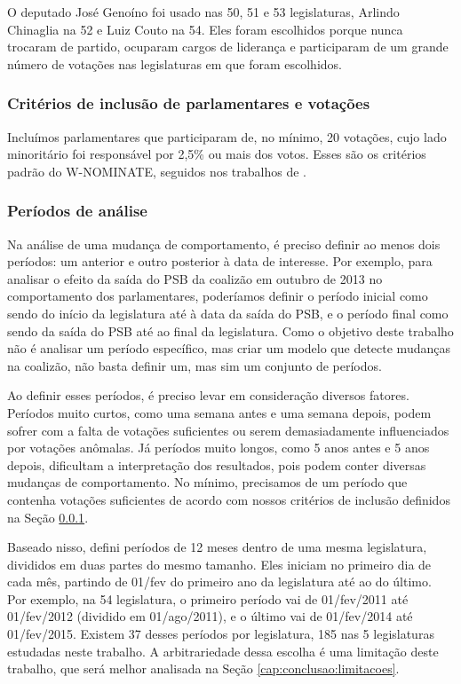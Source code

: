 \documentclass[a4paper,titlepage]{ppgi}\usepackage[]{graphicx}\usepackage[]{color}
\begin{document}
O deputado José Genoíno foi usado nas 50\textordfeminine{},
51\textordfeminine{} e 53\textordfeminine{} legislaturas, Arlindo Chinaglia na
52\textordfeminine{} e Luiz Couto na 54\textordfeminine{}. Eles foram
escolhidos porque nunca trocaram de partido, ocuparam cargos de liderança e
participaram de um grande número de votações nas legislaturas em que foram
escolhidos.

\subsubsection{Critérios de inclusão de parlamentares e votações}
\label{cap:desenvolvimento:criterios-de-inclusao}

Incluímos parlamentares que participaram de, no mínimo, 20 votações, cujo lado
minoritário foi responsável por 2,5\% ou mais dos votos. Esses são os critérios
padrão do W-NOMINATE, seguidos nos trabalhos de
.

\subsubsection{Períodos de análise}
\label{cap:desenvolvimento:periodos-de-analise}

Na análise de uma mudança de comportamento, é preciso definir ao menos dois
períodos: um anterior e outro posterior à data de interesse. Por exemplo, para
analisar o efeito da saída do PSB da coalizão em outubro de 2013 no
comportamento dos parlamentares, poderíamos definir o período inicial como
sendo do início da legislatura até à data da saída do PSB, e o período final
como sendo da saída do PSB até ao final da legislatura. Como o objetivo deste
trabalho não é analisar um período específico, mas criar um modelo que detecte
mudanças na coalizão, não basta definir um, mas sim um conjunto de
períodos.

Ao definir esses períodos, é preciso levar em consideração diversos fatores.
Períodos muito curtos, como uma semana antes e uma semana depois, podem sofrer
com a falta de votações suficientes ou serem demasiadamente influenciados por
votações anômalas. Já períodos muito longos, como 5 anos antes e 5 anos depois,
dificultam a interpretação dos resultados, pois podem conter diversas mudanças
de comportamento. No mínimo, precisamos de um período que contenha votações
suficientes de acordo com nossos critérios de inclusão definidos na Seção
\ref{cap:desenvolvimento:criterios-de-inclusao}.

Baseado nisso, defini períodos de 12 meses dentro de uma mesma legislatura,
divididos em duas partes do mesmo tamanho. Eles iniciam no primeiro dia de cada
mês, partindo de 01/fev do primeiro ano da legislatura até ao do último. Por
exemplo, na 54\textordfeminine{} legislatura, o primeiro período vai de
01/fev/2011 até 01/fev/2012 (dividido em 01/ago/2011), e o último vai de
01/fev/2014 até 01/fev/2015. Existem 37 desses períodos por legislatura, 185
nas 5 legislaturas estudadas neste trabalho. A arbitrariedade dessa escolha é
uma limitação deste trabalho, que será melhor analisada na Seção
\ref{cap:conclusao:limitacoes}.
\end{document}
